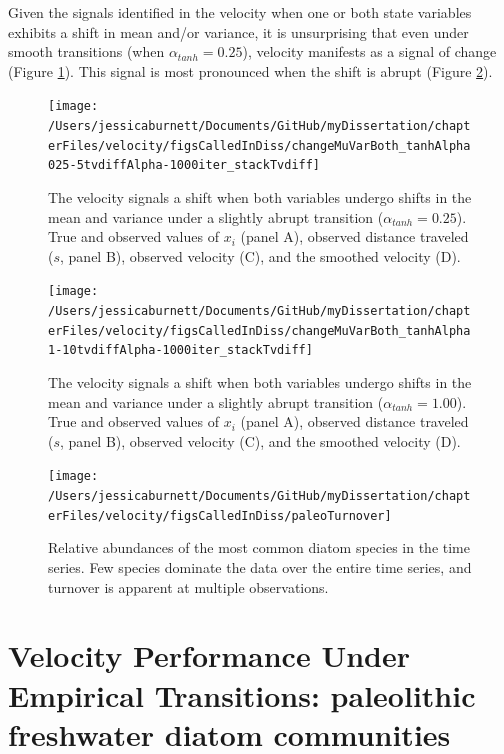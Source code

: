 \documentclass[12pt,twoside,openany]{reedthesis}
\begin{document}
Given the signals identified in the velocity when one or both state variables exhibits a shift in mean and/or variance, it is unsurprising that even under smooth transitions (when \(\alpha_{tanh} = 0.25\)), velocity manifests as a signal of change (Figure \ref{fig:muVarBoth25}). This signal is most pronounced when the shift is abrupt (Figure \ref{fig:muVarBoth1}).
\begin{figure}
\texttt{[image: /Users/jessicaburnett/Documents/GitHub/myDissertation/chapterFiles/velocity/figsCalledInDiss/changeMuVarBoth\_tanhAlpha025-5tvdiffAlpha-1000iter\_stackTvdiff]} \caption{The velocity signals a shift when both variables undergo shifts in the mean and variance under a slightly abrupt transition ($\alpha_{tanh}=0.25$). True and observed values of $x_i$ (panel A), observed distance traveled ($s$, panel B), observed velocity (C), and the smoothed velocity (D).}\label{fig:muVarBoth25}
\end{figure}
\newpage
\begin{figure}
\texttt{[image: /Users/jessicaburnett/Documents/GitHub/myDissertation/chapterFiles/velocity/figsCalledInDiss/changeMuVarBoth\_tanhAlpha1-10tvdiffAlpha-1000iter\_stackTvdiff]} \caption{The velocity signals a shift when both variables undergo shifts in the mean and variance under a slightly abrupt transition ($\alpha_{tanh}=1.00$). True and observed values of $x_i$ (panel A), observed distance traveled ($s$, panel B), observed velocity (C), and the smoothed velocity (D).}\label{fig:muVarBoth1}
\end{figure}
\begin{figure}
\texttt{[image: /Users/jessicaburnett/Documents/GitHub/myDissertation/chapterFiles/velocity/figsCalledInDiss/paleoTurnover]} \caption{Relative abundances of the most common diatom species in the time series. Few species dominate the data over the entire time series, and turnover is apparent at multiple observations.}\label{fig:paleoTurnover}
\end{figure}
\hypertarget{velocity-performance-under-empirical-transitions-paleolithic-freshwater-diatom-communities}{%
\section{Velocity Performance Under Empirical Transitions: paleolithic freshwater diatom communities}\label{velocity-performance-under-empirical-transitions-paleolithic-freshwater-diatom-communities}}
\end{document}
